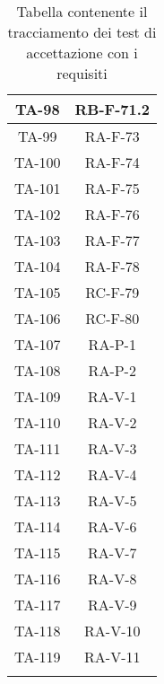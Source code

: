 \begin{center}
\begin{longtable}{|c|c|}
			\hline
			TA-98 & RB-F-71.2 \\
			\hline
			TA-99 & RA-F-73 \\
			\hline
			TA-100 & RA-F-74 \\
			\hline
			TA-101 & RA-F-75 \\
			\hline
			TA-102 & RA-F-76 \\
			\hline
			TA-103 & RA-F-77 \\
			\hline
			TA-104 & RA-F-78 \\
			\hline
			TA-105 & RC-F-79 \\
			\hline
			TA-106 & RC-F-80 \\
			\hline
			TA-107 & RA-P-1 \\
			\hline
			TA-108 & RA-P-2 \\
			\hline
			TA-109 & RA-V-1 \\
			\hline
			TA-110 & RA-V-2 \\
			\hline
			TA-111 & RA-V-3 \\
			\hline
			TA-112 & RA-V-4 \\
			\hline
			TA-113 & RA-V-5 \\
			\hline
			TA-114 & RA-V-6 \\
			\hline
			TA-115 & RA-V-7 \\
			\hline
			TA-116 & RA-V-8 \\
			\hline
			TA-117 & RA-V-9 \\
			\hline
			TA-118 & RA-V-10 \\
			\hline
			TA-119 & RA-V-11 \\
			\hline

			\caption{Tabella contenente il tracciamento dei test di accettazione con i requisiti}
			\end{longtable}
		\end{center}

